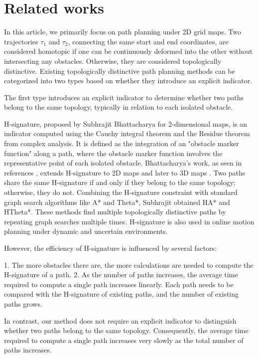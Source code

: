 \documentclass[letterpaper, 10 pt, journal, twoside]{IEEEtran}
\begin{document}
\section{Related works}
\label{RelatedWork}

In this article, we primarily focus on path planning under 2D grid maps. Two trajectories $\tau_1$ and $\tau_2$, connecting the same start and end coordinates, are considered homotopic if one can be continuously deformed into the other without intersecting any obstacles. Otherwise, they are considered topologically distinctive. Existing topologically distinctive path planning methods can be categorized into two types based on whether they introduce an explicit indicator.

The first type introduces an explicit indicator to determine whether two paths belong to the same topology, typically in relation to each isolated obstacle.

H-signature, proposed by Subhrajit Bhattacharya for 2-dimensional maps, is an indicator computed using the Cauchy integral theorem and the Residue theorem from complex analysis. It is defined as the integration of an "obstacle marker function" along a path, where the obstacle marker function involves the representative point of each isolated obstacle. Bhattacharya's work, as seen in references \cite{1, 6, 3}, extends H-signature to 2D maps and later to 3D maps \cite{bhattacharya2012search}. Two paths share the same H-signature if and only if they belong to the same topology; otherwise, they do not. Combining the H-signature constraint with standard graph search algorithms like A* and Theta*, Subhrajit obtained HA* and HTheta*. These methods find multiple topologically distinctive paths by repeating graph searches multiple times. H-signature is also used in online motion planning\cite{yi2018model} under dynamic and uncertain environments.

However, the efficiency of H-signature is influenced by several factors: 

1. The more obstacles there are, the more calculations are needed to compute the H-signature of a path.
2. As the number of paths increases, the average time required to compute a single path increases linearly. Each path needs to be compared with the H-signature of existing paths, and the number of existing paths grows.

In contrast, our method does not require an explicit indicator to distinguish whether two paths belong to the same topology. Consequently, the average time required to compute a single path increases very slowly as the total number of paths increases.
\end{document}

